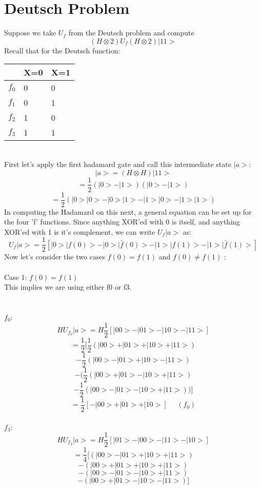 \documentclass[12pt]{article}
\begin{document}
\section{Deutsch Problem}

Suppose we take $U_{f}$ from the Deutsch problem and compute
$$(H\otimes 2)U_{f} (H\otimes 2)|11>$$
Recall that for the Deutsch function:
\\
\begin{table}[h]
\centering
    \begin{tabular}{|l|l|l|}
        \hline
        ~  & X=0 & X=1 \\ \hline
        $f_{0}$ & 0   & 0   \\ \hline
        $f_{1}$ & 0   & 1   \\  \hline
        $f_{2}$ & 1   & 0   \\ \hline
        $f_{3}$ & 1   & 1   \\
        \hline
    \end{tabular}
\end{table}
\\
First let's apply the first hadamard gate and call this intermediate state $|a>$:
$$|a> = (H\otimes H)|11>$$
$$= \frac{1}{2} (|0> - |1>)(|0> - |1>)$$
$$=\frac{1}{2}(|0>|0> - |0>|1> - |1>|0> - |1>|1>)$$
In computing the Hadamard on this next, a general equation can be set up for the four 'f' functions. Since anything XOR'ed with 0 is itself, and anything XOR'ed with 1 is it's complement, we can write $U_{f}|a>$ as:
$$U_{f}|a> = \frac{1}{2}[|0>|f(0)> - |0>|\bar{f}(0)> - |1>|f(1)> - |1>|\bar{f}(1)>] $$
Now let's consider the two cases $f(0)=f(1)$ and $f(0) \neq f(1)$ :
\\\\ Case 1: $f(0)=f(1)$
\\This implies we are using either f0 or f3.
\\\\\\$f_{0}$:
$$ HU_{f_{0}}|a> = H \frac{1}{2}[|00> - |01> - |10> - |11>]$$
$$ = \frac{1}{2}[\frac{1}{2}(|00> + |01> + |10> + |11>)
$$$$ - \frac{1}{2}(|00> - |01> + |10> - |11>)
$$$$- (\frac{1}{2}(|00> + |01> - |10> + |11>) 
$$$$- \frac{1}{2}(|00> - |01> - |10> + |11>))]$$
\[
\boxed{ = \frac{1}{2}[-|00> + |01> + |10>] \>\>\>\>\>\>(f_{0}) }
\] 
\\$f_{3}$:
$$ HU_{f_{3}}|a> = H  \frac{1}{2}[|01> - |00> - |11> - |10>]$$
$$ = \frac{1}{4}[ (|00> - |01> + |10> + |11>)
$$$$ -  (|00> + |01> + |10> + |11>)
$$$$- (|00> - |01> - |10> + |11>)
$$$$ - (|00> + |01> - |10> - |11>)]$$
\end{document}
